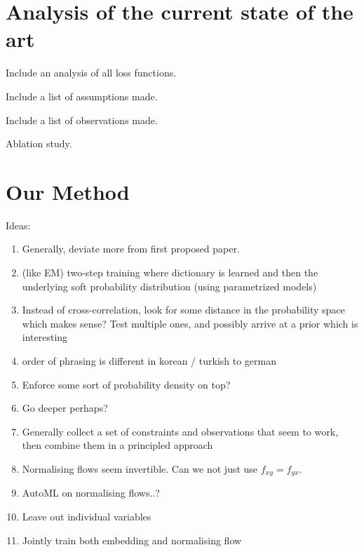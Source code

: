\documentclass[a4paper,12pt,twoside,openright]{report}
\begin{document}
\chapter{Analysis of the current state of the art}

Include an analysis of all loss functions.

Include a list of assumptions made.

Include a list of observations made.

Ablation study.

\chapter{Our Method}

Ideas:

\begin{enumerate}
\item Generally, deviate more from first proposed paper.
\item (like EM) two-step training where dictionary is learned and then the underlying soft probability distribution (using parametrized models)
\item Instead of cross-correlation, look for some distance in the probability space which makes sense? Test multiple ones, and possibly arrive at a prior which is interesting
\item order of phrasing is different in korean / turkish to german
\item Enforce some sort of probability density on top?
\item Go deeper perhaps?
\item Generally collect a set of constraints and observations that seem to work, then combine them in a principled approach
\item Normalising flows seem invertible. Can we not just use $f_{xy} = f_{yx}$.
\item AutoML on normalising flows..?
\item Leave out individual variables
\item Jointly train both embedding and normalising flow
\end{enumerate}
\end{document}
